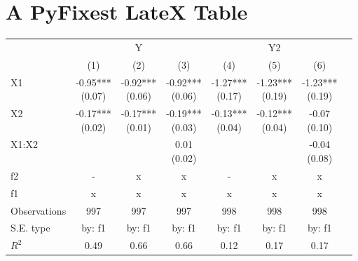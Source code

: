 \documentclass{article}%
\begin{document}
%
\normalsize%
\section{A PyFixest LateX Table}%
\label{sec:APyFixestLateXTable}%


\begin{table}[htbp]%
\renewcommand\cellalign{t}
\begin{threeparttable}
\begin{tabular}{lccccccc}
\toprule
 & \multicolumn{3}{c}{Y} & \multicolumn{3}{c}{Y2} \\
\cmidrule(lr){2-4} \cmidrule(lr){5-7} 
 & (1) & (2) & (3) & (4) & (5) & (6) \\
\midrule
\addlinespace
X1 & \makecell{-0.95*** \\ (0.07)} & \makecell{-0.92*** \\ (0.06)} & \makecell{-0.92*** \\ (0.06)} & \makecell{-1.27*** \\ (0.17)} & \makecell{-1.23*** \\ (0.19)} & \makecell{-1.23*** \\ (0.19)} \\
X2 & \makecell{-0.17*** \\ (0.02)} & \makecell{-0.17*** \\ (0.01)} & \makecell{-0.19*** \\ (0.03)} & \makecell{-0.13*** \\ (0.04)} & \makecell{-0.12*** \\ (0.04)} & \makecell{-0.07 \\ (0.10)} \\
X1:X2 &  &  & \makecell{0.01 \\ (0.02)} &  &  & \makecell{-0.04 \\ (0.08)} \\
\midrule
\addlinespace
f2 & - & x & x & - & x & x \\
f1 & x & x & x & x & x & x \\
\midrule
\addlinespace
Observations & 997 & 997 & 997 & 998 & 998 & 998 \\
S.E. type & by: f1 & by: f1 & by: f1 & by: f1 & by: f1 & by: f1 \\
$R^2$ & 0.49 & 0.66 & 0.66 & 0.12 & 0.17 & 0.17 \\
\bottomrule
\end{tabular}
\footnotesize 
\end{threeparttable}%
\end{table}

%
\end{document}
